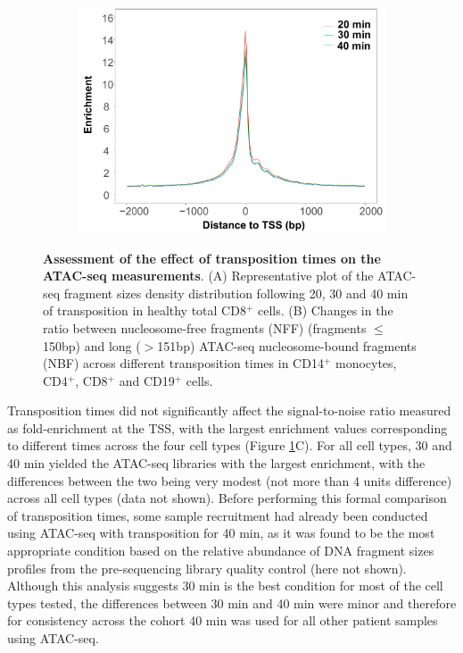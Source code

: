 \begin{figure}[htbp]
\begin{subfigure}{0.5\textwidth}
\centering
\includegraphics[width=\textwidth]{./Results1/pdfs/ATAC_optimisation_CD4_20_30_40_min_tss_enrichment}
\caption{\textbf{}} %
\end{subfigure}
\caption[Assessment of the effect of transposition times on the ATAC-seq measurements]{\textbf{Assessment of the effect of transposition times on the ATAC-seq measurements}. (A) Representative plot of the ATAC-seq fragment sizes density distribution following 20, 30 and 40 min of transposition in healthy total CD8$^+$ cells. (B) Changes in the ratio between nucleosome-free fragments (NFF) (fragments $\leq$150bp) and long ($>$151bp) ATAC-seq nucleosome-bound fragments (NBF) across different transposition times in CD14$^+$ monocytes, CD4$^+$, CD8$^+$ and CD19$^+$ cells.}
\label{figure:Transposition_times_ATAC}
\end{figure} 

Transposition times did not significantly affect the signal-to-noise ratio measured as fold-enrichment at the TSS, with the largest enrichment values corresponding to different times across the four cell types (Figure \ref{figure:Transposition_times_ATAC}C). For all cell types, 30 and 40 min yielded the ATAC-seq libraries with the largest enrichment, with the differences between the two being very modest (not more than 4 units difference) across all cell types (data not shown). Before performing this formal comparison of transposition times, some sample recruitment had already been conducted using ATAC-seq with transposition for 40 min, as it was found to be the most appropriate condition based on the relative abundance of DNA fragment sizes profiles from the pre-sequencing library quality control (here not shown). Although this analysis suggests 30 min is the best condition for most of the cell types tested, the differences between 30 min and 40 min were minor and therefore for consistency across the cohort 40 min was used for all other patient samples using ATAC-seq. 



